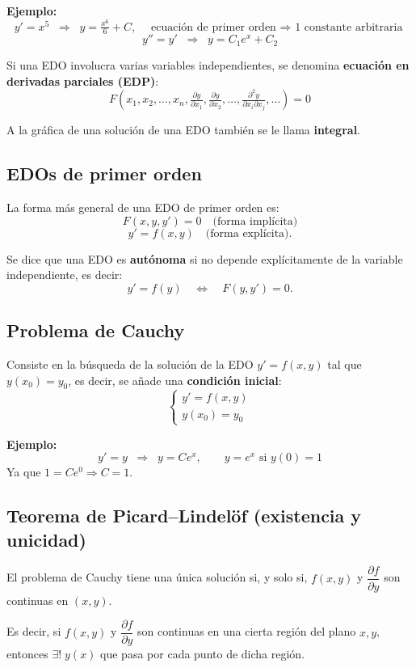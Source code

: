 \documentclass[a4paper,12pt]{article}
\begin{document}
\textbf{Ejemplo:}
\[
y' = x^5 \;\;\Rightarrow\;\; y = \tfrac{x^6}{6} + C, \quad \text{ecuación de primer orden $\Rightarrow$ 1 constante arbitraria}
\]
\[
y'' = y' \;\;\Rightarrow\;\; y = C_1 e^x + C_2
\]

Si una EDO involucra varias variables independientes, se denomina \textbf{ecuación en derivadas parciales (EDP)}:
\[
F(x_1,x_2,\ldots,x_n, \tfrac{\partial y}{\partial x_1}, \tfrac{\partial y}{\partial x_2}, \ldots, \tfrac{\partial^2 y}{\partial x_i \partial x_j}, \ldots ) = 0
\]

A la gráfica de una solución de una EDO también se le llama \textbf{integral}.  

\subsection*{EDOs de primer orden}

La forma más general de una EDO de primer orden es:
\[
F(x,y,y')=0 \quad \text{(forma implícita)}
\]
\[
y' = f(x,y) \quad \text{(forma explícita)}.
\]

Se dice que una EDO es \textbf{autónoma} si no depende explícitamente de la variable independiente, es decir:
\[
y' = f(y) \quad \Leftrightarrow \quad F(y,y')=0.
\]
\subsection{Problema de Cauchy}

Consiste en la búsqueda de la solución de la EDO $y' = f(x,y)$ tal que $y(x_0)=y_0$,
es decir, se añade una \textbf{condición inicial}:
\[
\begin{cases}
y' = f(x,y) \\
y(x_0) = y_0
\end{cases}
\]

\textbf{Ejemplo:}
\[
y' = y \;\;\Rightarrow\;\; y = C e^x, \qquad y=e^x \text{ si } y(0)=1
\]
Ya que $1 = C e^0 \Rightarrow C=1$.

\subsection{Teorema de Picard–Lindelöf (existencia y unicidad)}
El problema de Cauchy tiene una única solución si, y solo si, $f(x,y)$ y
$\dfrac{\partial f}{\partial y}$ son continuas en $(x,y)$.

Es decir, si $f(x,y)$ y $\dfrac{\partial f}{\partial y}$ son continuas en una cierta región del plano $x,y$,  
entonces $\exists! \; y(x)$ que pasa por cada punto de dicha región.
\end{document}
